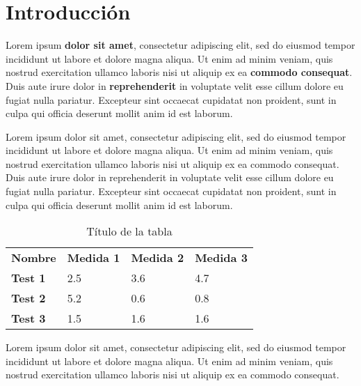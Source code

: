 \chapter{Introducción}

Lorem ipsum \textbf{dolor sit amet}, consectetur adipiscing elit, sed do eiusmod tempor incididunt ut labore et dolore magna aliqua. Ut enim ad minim veniam, quis nostrud exercitation ullamco laboris nisi ut aliquip ex ea \textbf{commodo consequat}. Duis aute irure dolor in \textbf{reprehenderit} in voluptate velit esse cillum dolore eu fugiat nulla pariatur. Excepteur sint occaecat cupidatat non proident, sunt in culpa qui officia deserunt mollit anim id est laborum.


Lorem ipsum dolor sit amet, consectetur adipiscing elit, sed do eiusmod tempor incididunt ut labore et dolore magna aliqua. Ut enim ad minim veniam, quis nostrud exercitation ullamco laboris nisi ut aliquip ex ea commodo consequat. Duis aute irure dolor in reprehenderit in voluptate velit esse cillum dolore eu fugiat nulla pariatur. Excepteur sint occaecat cupidatat non proident, sunt in culpa qui officia deserunt mollit anim id est laborum.

\begin{table}[h!]
	\centering
	\begin{tabular}{llll}
		\textbf{Nombre} & \textbf{Medida 1} & \textbf{Medida 2} & \textbf{Medida 3} \\
		\textbf{Test 1} & 2.5               & 3.6               & 4.7               \\
		\textbf{Test 2} & 5.2               & 0.6               & 0.8               \\
		\textbf{Test 3} & 1.5               & 1.6               & 1.6              
	\end{tabular}
	\caption{Título de la tabla}
\end{table}

Lorem ipsum dolor sit amet, consectetur adipiscing elit, sed do eiusmod tempor incididunt ut labore et dolore magna aliqua. Ut enim ad minim veniam, quis nostrud exercitation ullamco laboris nisi ut aliquip ex ea commodo consequat.